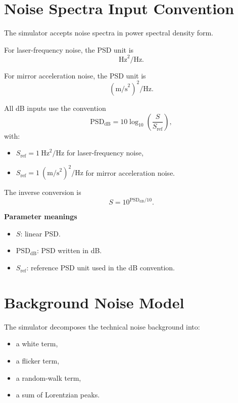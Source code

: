 \documentclass[11pt,a4paper]{article}
\begin{document}
\section{Noise Spectra Input Convention}

The simulator accepts noise spectra in power spectral density form.

For laser-frequency noise, the PSD unit is
\begin{equation}
  \mathrm{Hz}^2/\mathrm{Hz}.
\end{equation}

For mirror acceleration noise, the PSD unit is
\begin{equation}
  (\mathrm{m/s}^2)^2/\mathrm{Hz}.
\end{equation}

All dB inputs use the convention
\begin{equation}
  \mathrm{PSD}_{\mathrm{dB}} = 10\log_{10}\left(\frac{S}{S_{\mathrm{ref}}}\right),
\end{equation}
with:
\begin{itemize}[leftmargin=1.5em]
  \item $S_{\mathrm{ref}} = 1~\mathrm{Hz}^2/\mathrm{Hz}$ for laser-frequency noise,
  \item $S_{\mathrm{ref}} = 1~(\mathrm{m/s}^2)^2/\mathrm{Hz}$ for mirror acceleration noise.
\end{itemize}

The inverse conversion is
\begin{equation}
  S = 10^{\mathrm{PSD}_{\mathrm{dB}}/10}.
\end{equation}

\textbf{Parameter meanings}
\begin{itemize}[leftmargin=1.5em]
  \item $S$: linear PSD.
  \item $\mathrm{PSD}_{\mathrm{dB}}$: PSD written in dB.
  \item $S_{\mathrm{ref}}$: reference PSD unit used in the dB convention.
\end{itemize}

\section{Background Noise Model}

The simulator decomposes the technical noise background into:
\begin{itemize}[leftmargin=1.5em]
  \item a white term,
  \item a flicker term,
  \item a random-walk term,
  \item a sum of Lorentzian peaks.
\end{itemize}
\end{document}
